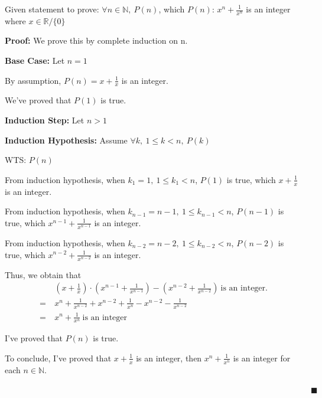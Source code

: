 \documentclass[12pt]{article}
\begin{document}
\begin{enumerate}[label=(\alph*)]
    Given statement to prove: $\forall n \in \mathbb{N},\ P(n)$, which $P(n)$: $x^n + \frac{1}{x^n}$ is an integer where $x \in \mathbb{R} / \{0\}$

    \textbf{Proof:} We prove this by complete induction on n.

    \textbf{Base Case:} Let $n = 1$

    By assumption, $ P(n) = x + \frac{1}{x}$ is an integer.

    We've proved that $P(1)$ is true.

    \textbf{Induction Step:} Let $n > 1$
    
    \textbf{Induction Hypothesis:} Assume $\forall k,\ 1 \leq k < n,\ P(k)$

    WTS: $P(n)$

    From induction hypothesis, when $k_1 = 1,\ 1 \leq k_1 < n$, $P(1)$ is true, which $x + \frac{1}{x}$ is an integer.
    
    From induction hypothesis, when $k_{n-1} = n-1,\ 1 \leq k_{n-1} < n$, $P(n-1)$ is true, which $x^{n-1} + \frac{1}{x^{n-1}}$ is an integer.

    From induction hypothesis, when $k_{n-2} = n-2,\ 1 \leq k_{n-2} < n$, $P(n-2)$ is true, which $x^{n-2} + \frac{1}{x^{n-2}}$ is an integer.

    Thus, we obtain that 
    \begin{align*}
        &(x+\frac{1}{x})\cdot (x^{n-1} + \frac{1}{x^{n-1}}) - (x^{n-2} + \frac{1}{x^{n-2}})\ \text{is an integer.} \\
        =\ &x^n + \frac{1}{x^{n-2}} + x^{n-2} + \frac{1}{x^n} - x^{n-2} - \frac{1}{x^{n-2}} \\
        =\ &x^n + \frac{1}{x^n} \ \text{is an integer}
    \end{align*}

    I've proved that $P(n)$ is true.

    To conclude, I've proved that $x+\frac{1}{x}$ is an integer, then $x^n + \frac{1}{x^n} $ is an integer for each $n \in \mathbb{N}$.

    $\quad \quad \quad \quad \quad \quad \quad \quad \quad \quad \quad \quad \quad \quad \quad \quad \quad \quad \quad \quad \quad \quad \quad \quad \quad \quad \quad \quad \quad \quad \quad \quad \quad \quad \quad \quad \quad \blacksquare $
\end{enumerate}

\newpage
\end{document}
